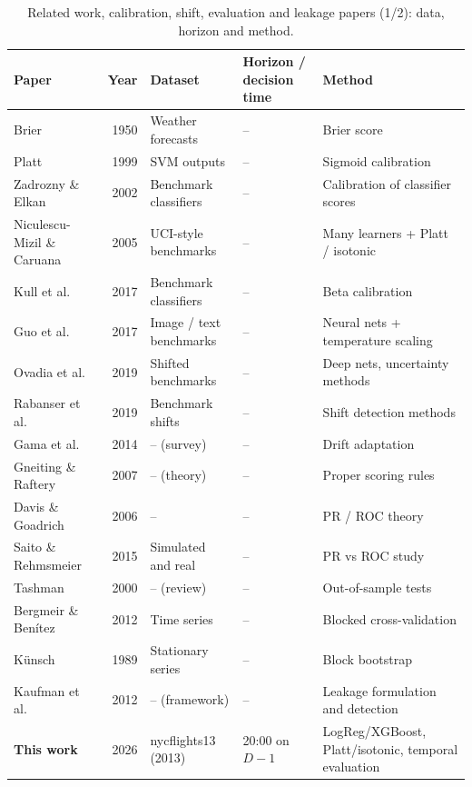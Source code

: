 \documentclass[conference]{IEEEtran}
\newcommand{\tabsize}{\footnotesize}
\begin{document}
\begin{table}[!t]
\caption[Related work: calibration, shift and leakage methods.]{Related work, calibration, shift, evaluation and leakage papers (1/2): data, horizon and method.}
\label{tab:rw2a}
\centering\tabsize
\begin{tabular}{@{}P{3.0cm}rP{3.3cm}P{3.3cm}P{3.9cm}@{}}
\toprule
Paper & Year & Dataset & Horizon / decision time & Method\\
\midrule
Brier \cite{brier1950} & 1950 & Weather forecasts & -- & Brier score\\
Platt \cite{platt1999} & 1999 & SVM outputs & -- & Sigmoid calibration\\
Zadrozny \& Elkan \cite{zadrozny2002} & 2002 & Benchmark classifiers & -- & Calibration of classifier scores\\
Niculescu-Mizil \& Caruana \cite{niculescu2005} & 2005 & UCI-style benchmarks & -- & Many learners + Platt / isotonic\\
Kull et al.\ \cite{kull2017beta} & 2017 & Benchmark classifiers & -- & Beta calibration\\
Guo et al.\ \cite{guo2017calibration} & 2017 & Image / text benchmarks & -- & Neural nets + temperature scaling\\
Ovadia et al.\ \cite{ovadia2019shift} & 2019 & Shifted benchmarks & -- & Deep nets, uncertainty methods\\
Rabanser et al.\ \cite{rabanser2019failing} & 2019 & Benchmark shifts & -- & Shift detection methods\\
Gama et al.\ \cite{gama2014drift} & 2014 & -- (survey) & -- & Drift adaptation\\
Gneiting \& Raftery \cite{gneiting2007scoring} & 2007 & -- (theory) & -- & Proper scoring rules\\
Davis \& Goadrich \cite{davis2006pr} & 2006 & -- & -- & PR / ROC theory\\
Saito \& Rehmsmeier \cite{saito2015pr} & 2015 & Simulated and real & -- & PR vs ROC study\\
Tashman \cite{tashman2000} & 2000 & -- (review) & -- & Out-of-sample tests\\
Bergmeir \& Ben\'itez \cite{bergmeir2012cv} & 2012 & Time series & -- & Blocked cross-validation\\
K\"unsch \cite{kunsch1989} & 1989 & Stationary series & -- & Block bootstrap\\
Kaufman et al.\ \cite{kaufman2012leakage} & 2012 & -- (framework) & -- & Leakage formulation and detection\\
\textbf{This work} & 2026 & nycflights13 (2013) & 20:00 on $D-1$ & LogReg/XGBoost, Platt/isotonic, temporal evaluation\\
\bottomrule
\end{tabular}
\end{table}
\end{document}
